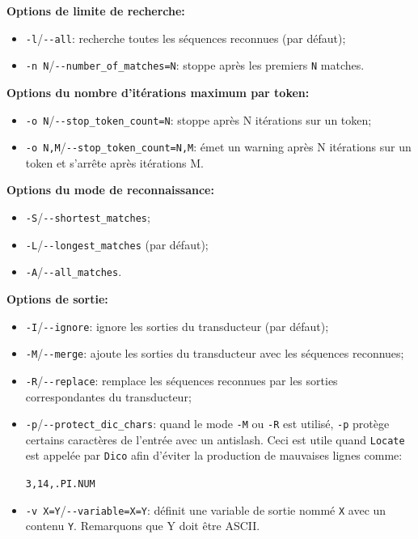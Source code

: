 \bigskip
\noindent \textbf{Options de limite de recherche:}
\begin{itemize}
\item \verb+-l+/\verb+--all+: recherche toutes les séquences reconnues (par défaut);
\item \verb+-n N+/\verb+--number_of_matches=N+: stoppe après les premiers
  \verb+N+ matches.
\end{itemize}

\bigskip
\noindent \textbf{Options du nombre d'itérations maximum par token:}
\begin{itemize}
\item \verb+-o N+/\verb+--stop_token_count=N+: stoppe après N itérations sur un token;
\item \verb+-o N,M+/\verb+--stop_token_count=N,M+: émet un warning après N itérations sur un token
	et s'arrête après itérations M.
\end{itemize}

\bigskip
\noindent \textbf{Options du mode de reconnaissance:}
\begin{itemize}
  \item \verb+-S+/\verb+--shortest_matches+;
  \item \verb+-L+/\verb+--longest_matches+ (par défaut);
  \item \verb+-A+/\verb+--all_matches+.
\end{itemize}

\bigskip
\noindent \textbf{Options de sortie:}
\begin{itemize}
\item \verb+-I+/\verb+--ignore+: ignore les sorties du transducteur (par défaut);
\item \verb+-M+/\verb+--merge+: ajoute les sorties du transducteur avec les séquences reconnues;
\item \verb+-R+/\verb+--replace+: remplace les séquences reconnues par les sorties correspondantes
	du transducteur;
\item \verb+-p+/\verb+--protect_dic_chars+: quand le mode \verb+-M+ ou \verb+-R+  est utilisé,
	\verb+-p+ protège certains caractères de l'entrée avec un antislash.
	Ceci est utile quand \verb+Locate+ est appelée par \verb+Dico+ afin d'éviter la production
	de mauvaises lignes comme:
  
  \verb+3,14,.PI.NUM+
  \item \verb+-v X=Y+/\verb+--variable=X=Y+: définit une variable de sortie nommé \verb+X+ avec un contenu
  	  \verb+Y+. 
  	  Remarquons que Y doit être ASCII.
\end{itemize}

